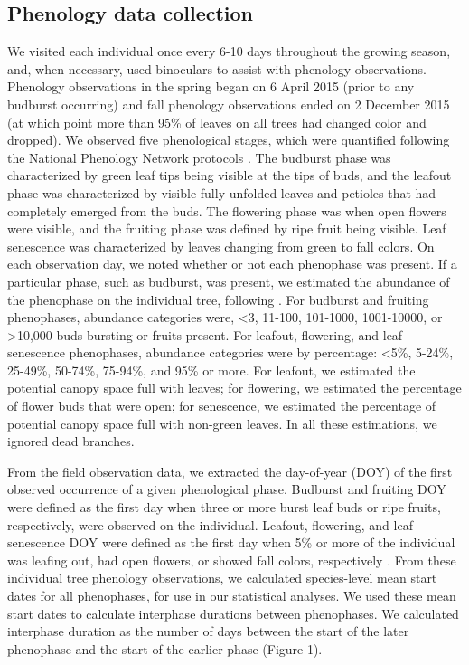 \documentclass{article}
\begin{document}
\subsection*{Phenology data collection}
We visited each individual once every 6-10 days throughout the growing season, and, when necessary, used binoculars to assist with phenology observations. Phenology observations in the spring began on 6 April 2015 (prior to any budburst occurring) and fall phenology observations ended on 2 December 2015 (at which point more than 95\% of leaves on all trees had changed color and dropped). We observed five phenological stages, which were quantified following the National Phenology Network protocols \citep[for a full description see][]{denny2014}. The budburst phase was characterized by green leaf tips being visible at the tips of buds, and the leafout phase was characterized by visible fully unfolded leaves and petioles that had completely emerged from the buds. The flowering phase was when open flowers were visible, and the fruiting phase was defined by ripe fruit being visible. Leaf senescence was characterized by leaves changing from green to fall colors. On each observation day, we noted whether or not each phenophase was present. If a particular phase, such as budburst, was present, we estimated the abundance of the phenophase on the individual tree, following \citet{denny2014}. For budburst and fruiting phenophases, abundance categories were, <3, 11-100, 101-1000, 1001-10000, or >10,000 buds bursting or fruits present. For leafout, flowering, and leaf senescence phenophases, abundance categories were by percentage: <5\%, 5-24\%, 25-49\%, 50-74\%, 75-94\%, and 95\% or more. For leafout, we estimated the potential canopy space full with leaves; for flowering, we estimated the percentage of flower buds that were open; for senescence, we estimated the percentage of potential canopy space full with non-green leaves. In all these estimations, we ignored dead branches. 
\par From the field observation data, we extracted the day-of-year (DOY) of the first observed occurrence of a given phenological phase. Budburst and fruiting DOY were defined as the first day when three or more burst leaf buds or ripe fruits, respectively, were observed on the individual. Leafout, flowering, and leaf senescence DOY were defined as the first day when 5\% or more of the individual was leafing out, had open flowers, or showed fall colors, respectively \citep{denny2014}. 
From these individual tree phenology observations, we calculated species-level mean start dates for all phenophases, for use in our statistical analyses. We used these mean start dates to calculate interphase durations between phenophases. We calculated interphase duration as the number of days between the start of the later phenophase and the start of the earlier phase (Figure 1).
\end{document}

